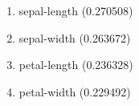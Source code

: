 \begin{enumerate}
\item sepal-length (0.270508)
\item sepal-width (0.263672)
\item petal-length (0.236328)
\item petal-width (0.229492)
\end{enumerate}